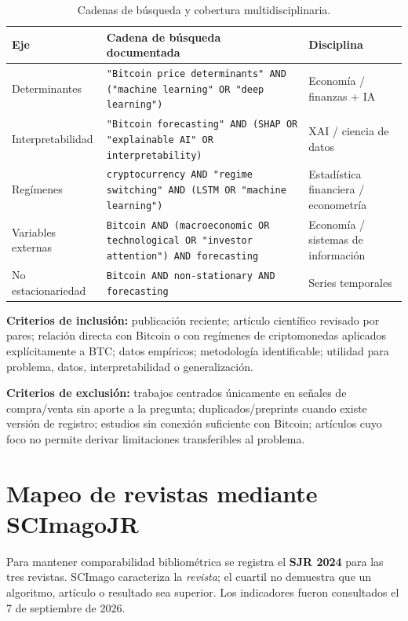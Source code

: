 \documentclass[11pt,letterpaper]{article}
\begin{document}
\begin{table}[ht]
\centering
\small
\caption{Cadenas de búsqueda y cobertura multidisciplinaria.}
\begin{tabularx}{\textwidth}{p{} X p{}}
\toprule
\textbf{Eje} & \textbf{Cadena de búsqueda documentada} & \textbf{Disciplina} \\
\midrule
Determinantes & \texttt{"Bitcoin price determinants" AND ("machine learning" OR "deep learning")} & Economía / finanzas + IA \\
Interpretabilidad & \texttt{"Bitcoin forecasting" AND (SHAP OR "explainable AI" OR interpretability)} & XAI / ciencia de datos \\
Regímenes & \texttt{cryptocurrency AND "regime switching" AND (LSTM OR "machine learning")} & Estadística financiera / econometría \\
Variables externas & \texttt{Bitcoin AND (macroeconomic OR technological OR "investor attention") AND forecasting} & Economía / sistemas de información \\
No estacionariedad & \texttt{Bitcoin AND non-stationary AND forecasting} & Series temporales \\
\bottomrule
\end{tabularx}
\end{table}

\textbf{Criterios de inclusión:} publicación reciente; artículo científico revisado por pares; relación directa con Bitcoin o con regímenes de criptomonedas aplicados explícitamente a BTC; datos empíricos; metodología identificable; utilidad para problema, datos, interpretabilidad o generalización.

\textbf{Criterios de exclusión:} trabajos centrados únicamente en señales de compra/venta sin aporte a la pregunta; duplicados/preprints cuando existe versión de registro; estudios sin conexión suficiente con Bitcoin; artículos cuyo foco no permite derivar limitaciones transferibles al problema.

\section{Mapeo de revistas mediante SCImagoJR}

Para mantener comparabilidad bibliométrica se registra el \textbf{SJR 2024} para las tres revistas. SCImago caracteriza la \emph{revista}; el cuartil no demuestra que un algoritmo, artículo o resultado sea superior. Los indicadores fueron consultados el 7 de septiembre de 2026.
\end{document}
